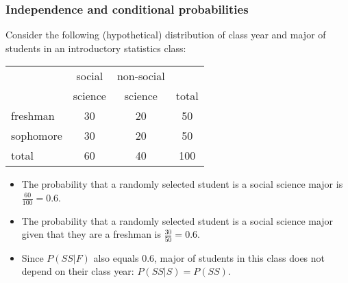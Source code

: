 \documentclass[slidestop,compress,mathserif]{beamer}
\begin{document}
\begin{frame}
\frametitle{Independence and conditional probabilities}

Consider the following (hypothetical) distribution of class year and major of students in an introductory statistics class:

{\small
\begin{center}
\begin{tabular}{l | c c | c}
			& social	& non-social 		&  \\
			& science	& science	& total \\
\hline
freshman		& 30		& 20		& 50 \\
sophomore			& 30		& 20		& 50 \\
\hline
total			& 60		& 40		& 100
\end{tabular}
\end{center}
}

\pause

\begin{itemize}

\item The probability that a randomly selected student is a social science major is \pause $\frac{60}{100} = 0.6$. 

\pause

\item The probability that a randomly selected student is a social science major given that they are a freshman is \pause $\frac{30}{50} = 0.6$. 

\pause

\item Since $P(SS | F)$ also equals 0.6, major of students in this class does not depend on their class year: $P(SS | S) = P(SS)$.

\end{itemize}

\end{frame}

\end{document}
